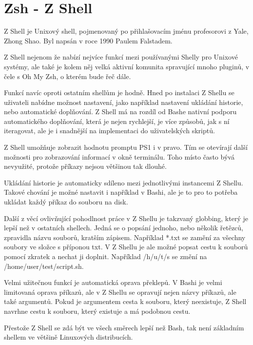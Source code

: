 \documentclass[thesis=M,czech]{FITthesis}[2012/06/26]
\begin{document}
%
%
%
\section{Zsh - Z Shell}

Z Shell je Unixový shell, pojmenovaný po přihlašovacím jménu profesorovi z Yale, Zhong Shao. Byl napsán v roce 1990 Paulem Falstadem.

Z Shell nejenom že nabízí nejvíce funkcí mezi používanými Shelly pro Unixové systémy, ale také je kolem něj velká aktivní komunita spravující mnoho pluginů, v čele s Oh My Zsh, o kterém bude řeč dále.

Funkcí navíc oproti ostatním shellům je hodně. Hned po instalaci Z Shellu se uživateli nabídne možnost nastavení, jako například nastavení ukládání historie, nebo automatické doplňování. Z Shell má na rozdíl od Bashe nativní podporu automatického doplňování, která je nejen rychlejší, je více způsobů, jak s ní iteragovat, ale je i snadnější na implementaci do uživatelských skriptů.

Z Shell umožňuje zobrazit hodnotu promptu PS1 i v pravo. Tím se otevírají další možnosti pro zobrazování informací v okně terminálu. Toho místo často bývá nevyužité, protože příkazy nejsou většinou tak dlouhé.

Ukládání historie je automaticky sdíleno mezi jednotlivými instancemi Z Shellu. Takové chování je možné nastavit i například v Bashi, ale je to pro to potřeba ukládat každý příkaz do souboru na disk.

Další z věcí ovlivňující pohodlnost práce v Z Shellu je takzvaný globbing, který je lepší než v ostatních shellech. Jedná se o popsání jednoho, nebo několik řetězců, zpravidla názvu souborů, kratším zápisem. Například *.txt se zamění za všechny soubory ve složce s příponou txt. V Z Shellu je ale možné popsat cestu k souborů pomocí zkratek a nechat ji doplnit. Například /h/u/t/s se změní na /home/user/test/script.sh.

Velmi užitečnou funkcí je automatická oprava překlepů. V Bashi je velmi limitovaná oprava příkazů, ale v Z Shellu se opravují nejen názvy příkazů, ale také argumentů. Pokud je argumentem cesta k souboru, který neexistuje, Z Shell navrhne cestu k souboru, který existuje a má podobnou cestu.

Přestože Z Shell se zdá být ve všech směrech lepší než Bash, tak není základním shellem ve většině Linuxových distribucích.

\end{document}
